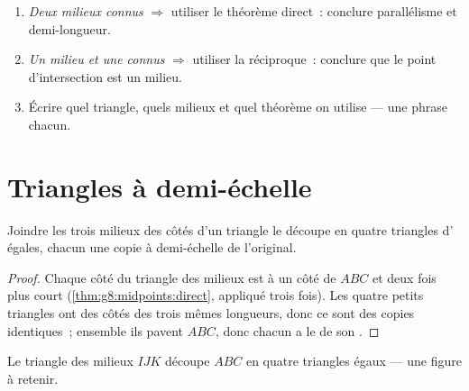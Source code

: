 \begin{method}\label{met:g8:midpoints:choose}
\begin{enumerate}
  \item \emph{Deux milieux connus} $\Rightarrow$ utiliser le théorème
        direct~: conclure parallélisme et demi-longueur.
  \item \emph{Un milieu et une  connus} $\Rightarrow$
        utiliser la réciproque~: conclure que le point d'intersection
        est un milieu.
  \item Écrire quel triangle, quels milieux et quel théorème on
        utilise --- une phrase chacun.
\end{enumerate}
\end{method}

\section{Triangles à demi-échelle}

\begin{proposition}\label{prop:g8:midpoints:medial}
Joindre les trois milieux des côtés d'un triangle le découpe en
quatre triangles d' égales, chacun une copie à demi-échelle de
l'original.
\end{proposition}

\begin{proof}
Chaque côté du triangle des milieux est  à un côté de $ABC$
et deux fois plus court (\cref{thm:g8:midpoints:direct}, appliqué
trois fois). Les quatre petits triangles ont des côtés des trois
mêmes longueurs, donc ce sont des copies identiques~; ensemble ils
pavent $ABC$, donc chacun a le  de son .
\end{proof}

\begin{omfigure}

{\small Le triangle des milieux $IJK$ découpe $ABC$ en quatre
triangles égaux --- une figure à retenir.}
\end{omfigure}

